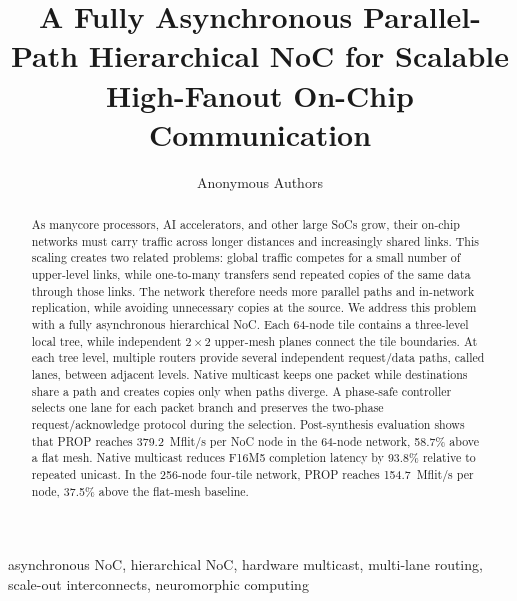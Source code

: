 \documentclass[conference]{IEEEtran}
\begin{document}
\setlength{\textfloatsep}{8pt}
\setlength{\dbltextfloatsep}{8pt}
\setlength{\floatsep}{6pt}
\setlength{\dblfloatsep}{6pt}

\title{A Fully Asynchronous Parallel-Path Hierarchical NoC for Scalable High-Fanout On-Chip Communication}

\author{Anonymous Authors}

\maketitle
\vspace{-3em}

\begin{abstract}
As manycore processors, AI accelerators, and other large SoCs grow, their on-chip networks must carry traffic across longer distances and increasingly shared links. This scaling creates two related problems: global traffic competes for a small number of upper-level links, while one-to-many transfers send repeated copies of the same data through those links. The network therefore needs more parallel paths and in-network replication, while avoiding unnecessary copies at the source. We address this problem with a fully asynchronous hierarchical NoC. Each 64-node tile contains a three-level local tree, while independent $2\times2$ upper-mesh planes connect the tile boundaries. At each tree level, multiple routers provide several independent request/data paths, called lanes, between adjacent levels. Native multicast keeps one packet while destinations share a path and creates copies only when paths diverge. A phase-safe controller selects one lane for each packet branch and preserves the two-phase request/acknowledge protocol during the selection. Post-synthesis evaluation shows that PROP reaches 379.2~Mflit/s per NoC node in the 64-node network, 58.7\% above a flat mesh. Native multicast reduces F16M5 completion latency by 93.8\% relative to repeated unicast. In the 256-node four-tile network, PROP reaches 154.7~Mflit/s per node, 37.5\% above the flat-mesh baseline.
\end{abstract}

\begin{IEEEkeywords}
asynchronous NoC, hierarchical NoC, hardware multicast, multi-lane routing, scale-out interconnects, neuromorphic computing
\end{IEEEkeywords}
\end{document}
